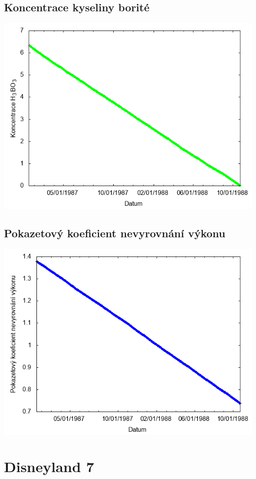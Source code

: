\documentclass[a4paper,twoside,11pt]{article}
\begin{document}
\subsection*{Koncentrace kyseliny borité}
\begin{center}
\includegraphics[width=.8\textwidth]{graphs/Disneyland_06_bc.png}
\end{center}

\subsection*{Pokazetový koeficient nevyrovnání výkonu}
\begin{center}
\includegraphics[width=.8\textwidth]{graphs/Disneyland_06_fha.png}
\end{center}

\newpage
\section*{Disneyland 7}
\end{document}

